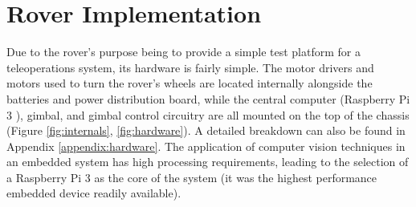 \chapter{Rover Implementation}
\label{chapter:rover}

Due to the rover's purpose being to provide a simple test platform for a teleoperations system, its hardware is fairly simple. The motor drivers and motors used to turn the rover's wheels are located internally alongside the batteries and power distribution board, while the central computer (Raspberry Pi 3 \cite{pi}), gimbal, and gimbal control circuitry are all mounted on the top of the chassis (Figure \ref{fig:internals}, \ref{fig:hardware}). A detailed breakdown can also be found in Appendix \ref{appendix:hardware}. The application of computer vision techniques in an embedded system has high processing requirements, leading to the selection of a Raspberry Pi 3 as the core of the system (it was the highest performance embedded device readily available). 

